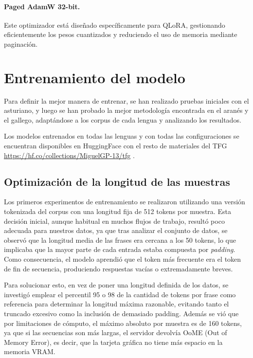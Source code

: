 \paragraph{Paged AdamW 32-bit.}
Este optimizador está diseñado específicamente para QLoRA, gestionando eficientemente los pesos cuantizados y reduciendo el uso de memoria mediante paginación.


\section{Entrenamiento del modelo}

Para definir la mejor manera de entrenar, se han realizado pruebas iniciales con el asturiano, y luego se han probado la mejor metodología encontrada en el aranés y el gallego, adaptándose a los corpus de cada lengua y analizando los resultados.

Los modelos entrenados en todas las lenguas y con todas las configuraciones se encuentran disponibles en HuggingFace con el resto de materiales del TFG \url{https://hf.co/collections/MiguelGP-13/tfg} \cite{asturian_lora_2025, asturian_concat_2025, asturian_concat_instructive_2025, galician_lora_2025, aranes_lora_2025, aranes_lora_instructive_2025}.

\subsection{Optimización de la longitud de las muestras}
\label{problemas-longitud-muestra}

Los primeros experimentos de entrenamiento se realizaron utilizando una versión tokenizada del corpus con una longitud fija de 512 tokens por muestra. Esta decisión inicial, aunque habitual en muchos flujos de trabajo, resultó poco adecuada para nuestros datos, ya que tras analizar el conjunto de datos, se observó que la longitud media de las frases era cercana a los 50 tokens, lo que implicaba que la mayor parte de cada entrada estaba compuesta por \textit{padding}. Como consecuencia, el modelo aprendió que el token más frecuente era el token de fin de secuencia, produciendo respuestas vacías o extremadamente breves. 

Para solucionar esto, en vez de poner una longitud definida de los datos, se investigó emplear el percentil 95 o 98 de la cantidad de tokens por frase como referencia para determinar la longitud máxima razonable, evitando tanto el truncado excesivo como la inclusión de demasiado padding. Además se vió que por limitaciones de cómputo, el máximo absoluto por muestra es de 160 tokens, ya que si las secuencias son más largas, el servidor devolvía OoME (Out of Memory Error), es decir, que la tarjeta gráfica no tiene más espacio en la memoria VRAM.


